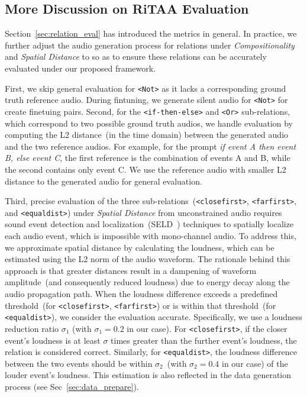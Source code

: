 \subsection{More Discussion on RiTAA Evaluation}

Section~\ref{sec:relation_eval} has introduced the metrics in general. In practice, we further adjust the audio generation process for relations under \emph{Compositionality} and \emph{Spatial Distance} to so as to ensure these relations can be accurately evaluated under our proposed framework.

First, we skip general evaluation for \texttt{<Not>} as it lacks a corresponding ground truth reference audio. During fintuning, we generate silent audio for \texttt{<Not>} for create finetuing pairs. Second, for the \texttt{<if-then-else>} and \texttt{<Or>} sub-relations, which correspond to two possible ground truth audios, we handle evaluation by computing the L2 distance~(in the time domain) between the generated audio and the two reference audios. For example, for the prompt \textit{if event A then event B, else event C}, the first reference is the combination of events A and B, while the second contains only event C. We use the reference audio with smaller L2 distance to the generated audio for general evaluation.

Third, precise evaluation of the three sub-relations~(\texttt{<closefirst>}, \texttt{<farfirst>}, and \texttt{<equaldist>}) under \emph{Spatial Distance} from unconstrained audio requires sound event detection and localization~(SELD~\citep{soundsynp,seld_dcase19}) techniques to spatially localize each audio event, which is impossible with mono-channel audio. To address this, we approximate spatial distance by calculating the loudness, which can be estimated using the L2 norm of the audio waveform. The rationale behind this approach is that greater distances result in a dampening of waveform amplitude~(and consequently reduced loudness) due to energy decay along the audio propagation path. When the loudness difference exceeds a predefined threshold~(for \texttt{<closefirst>}, \texttt{<farfirst>}) or is within that threshold~(for \texttt{<equaldist>}), we consider the evaluation accurate. Specifically, we use a loudness reduction ratio $\sigma_1$ (with $\sigma_1=0.2$ in our case). For \texttt{<closefirst>}, if the closer event's loudness is at least $\sigma$ times greater than the further event's loudness, the relation is considered correct. Similarly, for \texttt{<equaldist>}, the loudness difference between the two events should be within $\sigma_2$~(with $\sigma_2=0.4$ in our case) of the louder event's loudness. This estimation is also reflected in the data generation process (see Sec~\ref{sec:data_prepare}).

